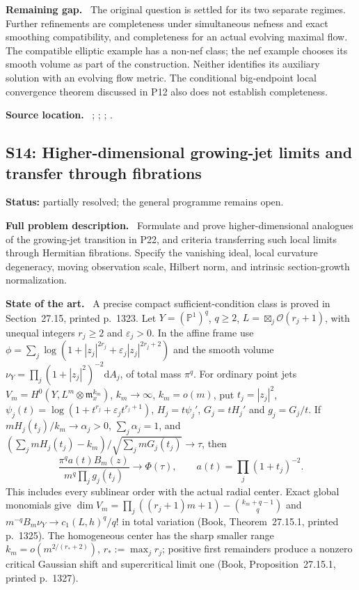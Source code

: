\documentclass[11pt]{article}
\newcommand{\field}[1]{\par\medskip\noindent\textbf{#1.}\ }
\begin{document}
\field{Remaining gap} The original question is settled for its two separate regimes. Further refinements are completeness under simultaneous nefness and exact smoothing compatibility, and completeness for an actual evolving maximal flow. The compatible elliptic example has a non-nef class; the nef example chooses its smooth volume as part of the construction. Neither identifies its auxiliary solution with an evolving flow metric. The conditional big-endpoint local convergence theorem discussed in P12 also does not establish completeness.
\field{Source location} ; ; ; .
\subsection{S14: Higher-dimensional growing-jet limits and transfer through fibrations}
\label{S14}
\noindent\textbf{Status:} partially resolved; the general programme remains open.
\field{Full problem description} Formulate and prove higher-dimensional analogues of the growing-jet transition in P22, and criteria transferring such local limits through Hermitian fibrations. Specify the vanishing ideal, local curvature degeneracy, moving observation scale, Hilbert norm, and intrinsic section-growth normalization.
\field{State of the art} A precise compact sufficient-condition class is proved in Section~27.15, printed p.~1323. Let $Y=(\mathbb P^1)^q$, $q\geq2$, $L=\boxtimes_j\mathcal O(r_j+1)$, with unequal integers $r_j\geq2$ and $\varepsilon_j>0$. In the affine frame use $\phi=\sum_j\log(1+|z_j|^{2r_j}+\varepsilon_j|z_j|^{2r_j+2})$ and the smooth volume $\nu_Y=\prod_j(1+|z_j|^2)^{-2}\mathrm dA_j$, of total mass $\pi^q$. For ordinary point jets $V_m=H^0(Y,L^m\otimes\mathfrak m_x^{k_m})$, $k_m\to\infty$, $k_m=o(m)$, put $t_j=|z_j|^2$, $\psi_j(t)=\log(1+t^{r_j}+\varepsilon_jt^{r_j+1})$, $H_j=t\psi_j'$, $G_j=tH_j'$ and $g_j=G_j/t$. If $mH_j(t_j)/k_m\to\alpha_j>0$, $\sum_j\alpha_j=1$, and $(\sum_jmH_j(t_j)-k_m)/\sqrt{\sum_jmG_j(t_j)}\to\tau$, then
\[
 \frac{\pi^q a(t)B_m(z)}{m^q\prod_jg_j(t_j)}\longrightarrow\Phi(\tau),
 \qquad a(t)=\prod_j(1+t_j)^{-2}.
\]
This includes every sublinear order with the actual radial center. Exact global monomials give $\dim V_m=\prod_j((r_j+1)m+1)-\binom{k_m+q-1}{q}$ and $m^{-q}B_m\nu_Y\to c_1(L,h)^q/q!$ in total variation (Book, Theorem~27.15.1, printed p.~1325). The homogeneous center has the sharp smaller range $k_m=o(m^{2/(r_*+2)})$, $r_*:=\max_jr_j$; positive first remainders produce a nonzero critical Gaussian shift and supercritical limit one (Book, Proposition~27.15.1, printed p.~1327).
\end{document}

